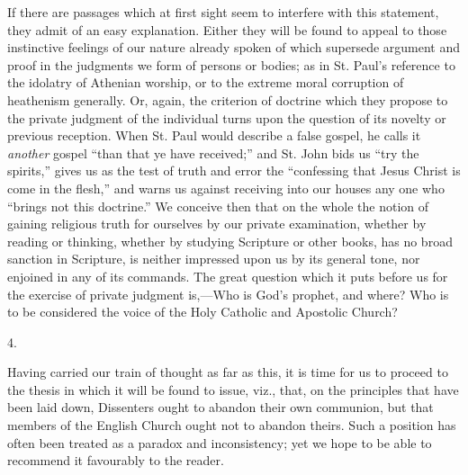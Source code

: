 If there are passages which at first sight seem to interfere with
this statement, they admit of an easy explanation. Either they
will be found to appeal to those instinctive feelings of our nature
already spoken of which supersede argument and proof in the judgments
we form of persons or bodies; as in St. Paul's reference to the
idolatry of Athenian worship, or to the extreme moral corruption of
heathenism generally. Or, again, the criterion of doctrine which they
propose to the private judgment of the individual turns upon the
question of its novelty or previous reception. When St. Paul would
describe a false gospel, he calls it \emph{another} gospel ``than that ye
have received;'' and St. John bids us ``try the spirits,''
gives us as the test of truth and error the ``confessing that
Jesus Christ is come in the flesh,'' and warns us against
receiving into our houses any one who ``brings not this
doctrine.'' We conceive then that on the whole the notion of
gaining religious truth for ourselves by our private examination,
whether by reading or thinking, whether by studying Scripture or other
books, has no broad sanction in Scripture, is neither impressed upon
us by its general tone, nor enjoined in any of its commands. The great
question which it puts before us for the exercise of private judgment
is,—Who is God's prophet, and where? Who is to be considered the
voice of the Holy Catholic and Apostolic Church?

4.

Having carried our train of thought as far as this, it is time for
us to proceed to the thesis in which it will be found to issue, viz.,
that, on the principles that have been laid down, Dissenters ought to
abandon their own communion, but that members of the English Church
ought not to abandon theirs. Such a position has often been treated as
a paradox and inconsistency; yet we hope to be able to recommend
it favourably to the reader.

